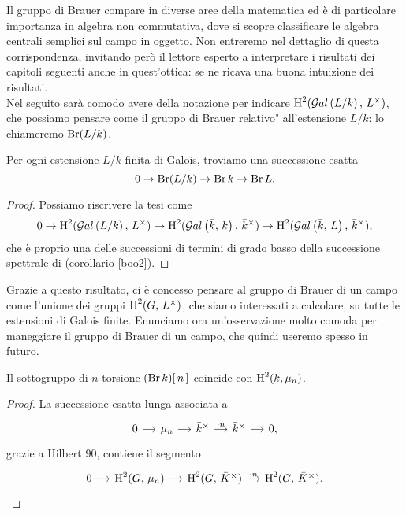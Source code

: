 Il gruppo di Brauer compare in diverse aree della matematica ed è di particolare importanza in algebra non commutativa, dove si scopre classificare le algebra centrali semplici sul campo in oggetto. Non entreremo nel dettaglio di questa corrispondenza, invitando però il lettore esperto a interpretare i risultati dei capitoli seguenti anche in quest'ottica: se ne ricava una buona intuizione dei risultati.\\

Nel seguito sarà comodo avere della notazione per indicare $ \operatorname{H}^2(\mathcal{G}al\left( L/k \right), \, L^\times) $, che possiamo pensare come il gruppo di Brauer \leftquote relativo" all'estensione $ L/k $: lo chiameremo $ \operatorname{Br}(L/k) $.

\begin{lemma}\label{stronzetto}
	Per ogni estensione $ L/k $ finita di Galois, troviamo una successione esatta
	\[ 0 \to \operatorname{Br}(L/k) \to \operatorname{Br} k \to \operatorname{Br} L.  \]
\end{lemma}
\begin{proof}
	Possiamo riscrivere la tesi come
	\[ 0 \to \operatorname{H}^2(\mathcal{G}al\left( L/k \right), \, L^\times) \to \operatorname{H}^2(\mathcal{G}al\left( \bar{k}, \, k \right), \, \bar{k}^\times) \to \operatorname{H}^2(\mathcal{G}al\left( \bar{k}, \, L \right), \, \bar{k}^\times), \]
	che è proprio una delle successioni di termini di grado basso della successione spettrale di \HS (corollario \ref{boo2}).
\end{proof}

Grazie a questo risultato, ci è concesso pensare al gruppo di Brauer di un campo come l'unione dei gruppi $ \operatorname{H}^2(G, \, L^\times) $, che siamo interessati a calcolare, su tutte le estensioni di Galois finite. Enunciamo ora un'osservazione molto comoda per maneggiare il gruppo di Brauer di un campo, che quindi useremo spesso in futuro.

\begin{proposition} \label{torsione del brauer}
	Il sottogruppo di $ n $-torsione $ (\operatorname{Br} k) [\,n\,] $ coincide con $ \operatorname{H}^2(k, \mu_n) $.
\end{proposition}
\begin{proof}
	La successione esatta lunga associata a 
	\[\begin{tikzcd}[column sep = small]
	0 \rar
	& \mu_n \rar
	& \bar{k}^\times \rar["\cdot n"]
	& \bar{k}^\times \rar
	& 0,
	\end{tikzcd}  \]
	grazie a Hilbert 90, contiene il segmento
	\[\begin{tikzcd}[column sep = small]
	0 \rar
	& \HH^2(G, \, \mu_n) \rar
	& \HH^2(G, \, \bar{\K}^\times) \rar["\cdot n"]
	& \HH^2(G, \, \bar{\K}^\times).
	\end{tikzcd} \qedhere \]
\end{proof}

